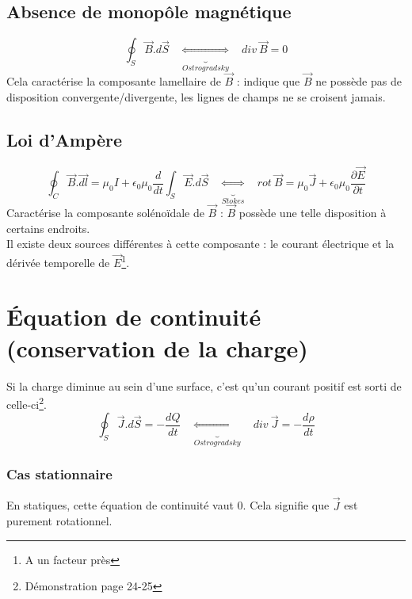 \documentclass[british,french,11pt, a4paper, openany]{book}
\begin{document}
		\subsection{Absence de monopôle magnétique}
		\begin{equation}
		\oint_S \vec{B}.d\vec{S}\ \ \ \ \underbrace{\Leftrightarrow}_{Ostrogradsky}\ \ \ \ div\ \vec{B} = 0
		\end{equation}
		Cela caractérise la composante lamellaire de $\vec{B}$ : indique que $\vec{B}$ ne possède pas de disposition convergente/divergente, les lignes de champs ne se croisent jamais. \\
		
		
		\subsection{Loi d'Ampère}
		\begin{equation}
		\oint_C \vec{B}.\vec{dl} = \mu_0 I + \epsilon_0\mu_0\dfrac{d}{dt}\int_S \vec{E}.d\vec{S}\ \ \ \ \underbrace{\Leftrightarrow}_{Stokes}\ \ \ \ rot\ \vec{B} = \mu_0\vec{J} + \epsilon_0\mu_0 \dfrac{\partial \vec{E}}{\partial t}
		\end{equation}
		Caractérise la composante solénoïdale de $\vec{B}$ : $\vec{B}$ possède une telle disposition à certains endroits.\\
		Il existe deux sources différentes à cette composante : le courant électrique et la dérivée temporelle de $\vec{E}$\footnote{A un facteur près}.\\
		
		
		\section{Équation de continuité (conservation de la charge)}
		Si la charge diminue au sein d'une surface, c'est qu'un courant positif est sorti de celle-ci\footnote{Démonstration page 24-25}.
		\begin{equation}
		\oint_S \vec{J}.d\vec{S} = - \dfrac{dQ}{dt}\ \ \ \ \underbrace{\Leftrightarrow}_{Ostrogradsky}\ \ \ \ div\ \vec{J} = -\frac{d\rho}{dt}
		\end{equation}
		
		\subsubsection{Cas stationnaire}
		En statiques, cette équation de continuité vaut 0. Cela signifie que $\vec{J}$ est purement rotationnel.
		
\end{document}
